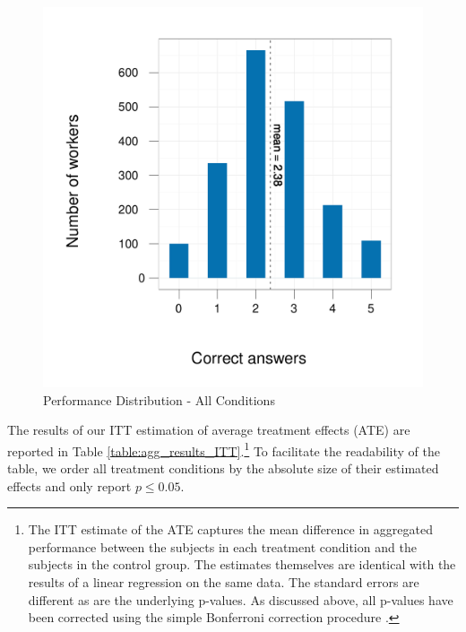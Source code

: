 \documentclass{cscw2010}
\begin{document}
\begin{figure} 
\centering 
\caption{Performance Distribution - All Conditions \label{fig:AggPerf}}
\includegraphics[scale=.4]{../images/AggPerf}
\end{figure} 

The results of our ITT estimation of average treatment effects (ATE)
are reported in Table \ref{table:agg_results_ITT}.\footnote{The ITT
  estimate of the ATE captures the mean difference in aggregated
  performance between the subjects in each treatment condition and the
  subjects in the control group. The estimates themselves are
  identical with the results of a linear regression on the same
  data. The standard errors are different as are the underlying
  p-values\cite{freedman2008logistic, freedman2008multtreat}. As
  discussed above, all p-values have been corrected using the simple
  Bonferroni correction procedure \cite{shaffer1995, hsu1996}.} To
facilitate the readability of the table, we order all treatment
conditions by the absolute size of their estimated effects and only report $p \leq 0.05$.
\end{document}
